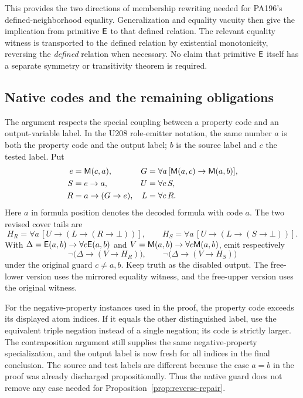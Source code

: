 This provides the two directions of membership rewriting needed for
PA196's defined-neighborhood equality. Generalization and equality
vacuity then give the implication from primitive $\mathsf E$ to that defined
relation. The relevant equality witness is transported to the defined
relation by existential monotonicity, reversing the \emph{defined}
relation when necessary. No claim that primitive $\mathsf E$ itself has a
separate symmetry or transitivity theorem is required.

\subsection{Native codes and the remaining obligations}

The argument respects the special coupling between a property code and
an output-variable label. In the U208 role-emitter notation, the same
number $a$ is both the property code and the output label; $b$ is the
source label and $c$ the tested label. Put
\begin{align*}
 e&=\mathsf M(c,a), &
 G&=\forall a\,[\mathsf M(a,c)\to\mathsf M(a,b)],\\
 S&=e\to a, & U&=\forall c\,S,\\
 R&=a\to(G\to e), & L&=\forall c\,R.
\end{align*}
Here $a$ in formula position denotes the decoded formula with code $a$.
The two revised cover tails are
\[
 H_R=\forall a\,[U\to(L\to(R\to\bot))],\qquad
 H_S=\forall a\,[U\to(L\to(S\to\bot))].
\]
With $\Delta=\mathsf E(a,b)\to\forall c\mathsf E(a,b)$ and
$V=\mathsf M(a,b)\to\forall c\mathsf M(a,b)$, emit respectively
\[
 \neg\bigl(\Delta\to(V\to H_R)\bigr),\qquad
 \neg\bigl(\Delta\to(V\to H_S)\bigr)
\]
under the original guard $c\ne a,b$. Keep truth as the disabled output.
The free-lower version uses the mirrored equality witness, and the
free-upper version uses the original witness.

For the negative-property instances used in the proof, the property code
exceeds its displayed atom indices. If it equals the other distinguished
label, use the equivalent triple negation instead of a single negation;
its code is strictly larger. The contraposition argument still supplies
the same negative-property specialization, and the output label is now
fresh for all indices in the final conclusion. The source and test labels
are different because the case $a=b$ in the proof was already discharged
propositionally. Thus the native guard does not remove any case needed
for Proposition~\ref{prop:reverse-repair}.

